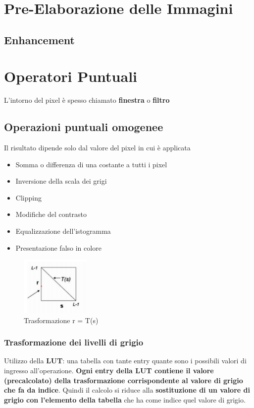 \documentclass[12pt]{article}
\begin{document}
\section{Pre-Elaborazione delle Immagini}
\subsection{Enhancement}
\section{Operatori Puntuali}
L'intorno del pixel è spesso chiamato \textbf{finestra} o \textbf{filtro}
\subsection{Operazioni puntuali omogenee} Il risultato dipende solo dal valore del pixel in cui è applicata
\begin{itemize}
    \item Somma o differenza di una costante a tutti i pixel
    \item Inversione della scala dei grigi
    \item Clipping
    \item Modifiche del contrasto
    \item Equalizzazione dell'istogramma
    \item Presentazione falso in colore
\end{itemize}

\begin{figure}[!htb]
    \centering
    \includegraphics[width=0.3\textwidth]{Images/rsT.png}
    \caption{Trasformazione r = T(s)}
\end{figure}

\subsubsection{Trasformazione dei livelli di grigio}
Utilizzo della \textbf{LUT}: una tabella con tante entry quante sono i possibili valori di ingresso all’operazione. \textbf{Ogni entry della LUT contiene il valore (precalcolato) della trasformazione corrispondente al valore di grigio che fa da indice}. Quindi il calcolo si riduce alla \textbf{sostituzione di un valore di grigio con l’elemento della tabella} che ha come indice quel valore di grigio.
\end{document}
